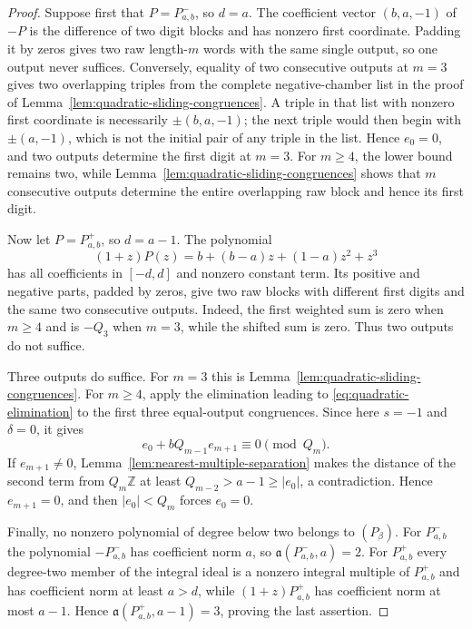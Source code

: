 \begin{proof}
Suppose first that $P=P^-_{a,b}$, so $d=a$.  The coefficient vector
$(b,a,-1)$ of $-P$ is the difference of two digit blocks and has nonzero
first coordinate.  Padding it by zeros gives two raw length-$m$ words with
the same single output, so one output never suffices.  Conversely, equality
of two consecutive outputs at $m=3$ gives two overlapping triples from the
complete negative-chamber list in the proof of
Lemma~\ref{lem:quadratic-sliding-congruences}.  A triple in that list with
nonzero first coordinate is necessarily $\pm(b,a,-1)$; the next triple would
then begin with $\pm(a,-1)$, which is not the initial pair of any triple in
the list.  Hence $e_0=0$, and two outputs determine the first digit at
$m=3$.  For $m\ge4$, the lower bound remains two, while
Lemma~\ref{lem:quadratic-sliding-congruences} shows that $m$ consecutive
outputs determine the entire overlapping raw block and hence its first digit.

Now let $P=P^+_{a,b}$, so $d=a-1$.  The polynomial
\[
(1+z)P(z)=b+(b-a)z+(1-a)z^2+z^3
\]
has all coefficients in $[-d,d]$ and nonzero constant term.  Its positive
and negative parts, padded by zeros, give two raw blocks with different first
digits and the same two consecutive outputs.  Indeed, the first weighted sum
is zero when $m\ge4$ and is $-Q_3$ when $m=3$, while the shifted sum is zero.
Thus two outputs do not suffice.

Three outputs do suffice.  For $m=3$ this is
Lemma~\ref{lem:quadratic-sliding-congruences}.  For $m\ge4$, apply the
elimination leading to \eqref{eq:quadratic-elimination} to the first three
equal-output congruences.  Since here $s=-1$ and $\delta=0$, it gives
\[
e_0+bQ_{m-1}e_{m+1}\equiv0\pmod{Q_m}.
\]
If $e_{m+1}\ne0$, Lemma~\ref{lem:nearest-multiple-separation} makes the
distance of the second term from $Q_m\mathbb Z$ at least
$Q_{m-2}>a-1\ge|e_0|$, a contradiction.  Hence $e_{m+1}=0$, and then
$|e_0|<Q_m$ forces $e_0=0$.

Finally, no nonzero polynomial of degree below two belongs to $(P_\beta)$.
For $P^-_{a,b}$ the polynomial $-P^-_{a,b}$ has coefficient norm $a$, so
$\mathfrak a(P^-_{a,b},a)=2$.  For $P^+_{a,b}$ every degree-two member of
the integral ideal is a nonzero integral multiple of $P^+_{a,b}$ and has
coefficient norm at least $a>d$, while $(1+z)P^+_{a,b}$ has coefficient norm
at most $a-1$.  Hence $\mathfrak a(P^+_{a,b},a-1)=3$, proving the last
assertion.
\end{proof}

